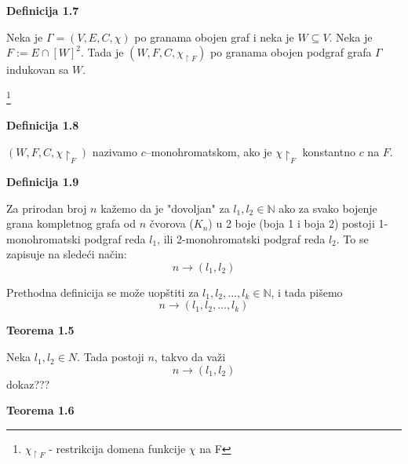 \documentclass[12pt,a4paper]{article}
\newcommand\blfootnote[1]{%
  \begingroup
  \renewcommand\thefootnote{}\footnote{#1}%
  \addtocounter{footnote}{-1}%
  \endgroup
}
\begin{document}
	\begin{mdframed}

	{\noindent\fontsize{12pt}{12pt}\textbf{Definicija 1.7}}
	\vspace{0.5em}

	\noindent Neka je $\Gamma = (V, E, C, \chi)$ po granama obojen graf i neka je $W \subseteq V$. 
	Neka je $F := E \cap [W]^{2}$.
	Tada je $(W , F, C, \chi_{\upharpoonright F})$  po granama obojen podgraf grafa $\Gamma$ indukovan sa $W$.
	\end{mdframed}
	\vspace{0.5em}

\blfootnote{$ \chi_{\upharpoonright F}$ - restrikcija domena funkcije $\chi$ na F}

	\begin{mdframed}
	{\noindent\fontsize{12pt}{12pt}\textbf{Definicija 1.8}}
	\vspace{0.5em}

	\noindent 	$(W , F, C, \chi\upharpoonright_{F})$ nazivamo $c$–monohromatskom, ako je $\chi\upharpoonright_{F}$ konstantno $c$ na $F$.
	\end{mdframed}
	\vspace{0.5em}

	\begin{mdframed}
	{\noindent\fontsize{12pt}{12pt}\textbf{Definicija 1.9}}
	\vspace{0.5em}

	\noindent Za prirodan broj $n$ kažemo da je "dovoljan" za $l_1, l_2 \in \mathbb{N}$ ako za svako bojenje grana kompletnog grafa od $n$ čvorova ($K_n$) u 2 boje (boja 1 i boja 2) postoji 1-monohromatski podgraf reda $l_1$, ili 2-monohromatski podgraf reda $l_2$. To se zapisuje na sledeći način: \[n \rightarrow (l_{1}, l_{2})\] 
	\end{mdframed}
	
	\noindent Prethodna definicija se može uopštiti za $l_1, l_2, ... , l_k  \in \mathbb{N}$, i tada pišemo \[n \rightarrow (l_1, l_2, ... , l_k)\]
	\vspace{0.5em}

	

	{\noindent\fontsize{12pt}{12pt}\textbf{Teorema 1.5}}
	\vspace{0.5em}

	\noindent	Neka $l_{1}, l_{2} \in N$. Tada postoji $n$, takvo da važi
	\[n \rightarrow (l_{1}, l_{2})\] dokaz???
	\vspace{1.5em}\

	{\noindent\fontsize{12pt}{12pt}\textbf{Teorema 1.6}}
	\vspace{0.5em}
\end{document}
